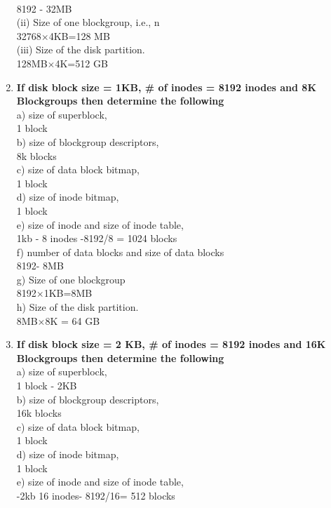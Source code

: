 \documentclass[a4paper,12pt]{article}
\begin{document}
\begin{flushleft}
\begin{enumerate}
\\{\color{red}8192 - 32MB}\\
(ii) Size of one blockgroup, i.e., n
\\{\color{red}32768$\times$4KB=128 MB}\\
(iii) Size of the disk partition.
\\{\color{red}128MB$\times$4K=512 GB}\\
\item \textbf{ If disk block size = 1KB, \# of inodes = 8192 inodes and 8K Blockgroups then determine the following}\\
a) size of superblock,
\\{\color{red}1 block}\\
b) size of blockgroup descriptors,
\\{\color{red}8k blocks}\\
c) size of data block bitmap,
\\{\color{red}1 block}\\
d) size of inode bitmap,
\\{\color{red}1 block}\\
e) size of inode and size of inode table,
\\{\color{red}1kb - 8 inodes -8192/8 = 1024 blocks }\\
f) number of data blocks and size of data blocks
\\{\color{red}8192- 8MB}\\
g) Size of one blockgroup
\\{\color{red}8192$\times$1KB=8MB}\\
h) Size of the disk partition.
\\{\color{red}8MB$\times$8K = 64 GB}\\
\item \textbf{ If disk block size = 2 KB, \# of inodes = 8192 inodes and 16K Blockgroups then determine the following}\\
a) size of superblock,
\\{\color{red}1 block - 2KB}\\
b) size of blockgroup descriptors,
\\{\color{red}16k blocks}\\
c) size of data block bitmap,
\\{\color{red}1 block}\\
d) size of inode bitmap,
\\{\color{red}1 block}\\
e) size of inode and size of inode table,
\\{\color{red}-2kb 16 inodes- 8192/16= 512 blocks}\\

\end{enumerate}
\end{flushleft}
\end{document}
